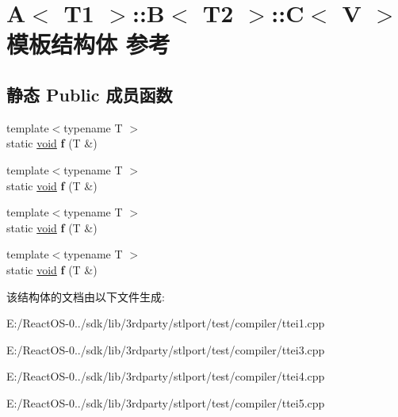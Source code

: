 \hypertarget{struct_a_1_1_b_1_1_c}{}\section{A$<$ T1 $>$\+:\+:B$<$ T2 $>$\+:\+:C$<$ V $>$ 模板结构体 参考}
\label{struct_a_1_1_b_1_1_c}
\subsection*{静态 Public 成员函数}
\begin{DoxyCompactItemize}
\item 
\mbox{\label{struct_a_1_1_b_1_1_c_a9e475b64f8657ce53630bd995e39de63}} 
{\footnotesize template$<$typename T $>$ }\\static \hyperlink{interfacevoid}{void} {\bfseries f} (T \&)
\item 
\mbox{\label{struct_a_1_1_b_1_1_c_a9e475b64f8657ce53630bd995e39de63}} 
{\footnotesize template$<$typename T $>$ }\\static \hyperlink{interfacevoid}{void} {\bfseries f} (T \&)
\item 
\mbox{\label{struct_a_1_1_b_1_1_c_a9e475b64f8657ce53630bd995e39de63}} 
{\footnotesize template$<$typename T $>$ }\\static \hyperlink{interfacevoid}{void} {\bfseries f} (T \&)
\item 
\mbox{\label{struct_a_1_1_b_1_1_c_a9e475b64f8657ce53630bd995e39de63}} 
{\footnotesize template$<$typename T $>$ }\\static \hyperlink{interfacevoid}{void} {\bfseries f} (T \&)
\end{DoxyCompactItemize}


该结构体的文档由以下文件生成\+:\begin{DoxyCompactItemize}
\item 
E\+:/\+React\+O\+S-\/0../sdk/lib/3rdparty/stlport/test/compiler/ttei1.\+cpp\item 
E\+:/\+React\+O\+S-\/0../sdk/lib/3rdparty/stlport/test/compiler/ttei3.\+cpp\item 
E\+:/\+React\+O\+S-\/0../sdk/lib/3rdparty/stlport/test/compiler/ttei4.\+cpp\item 
E\+:/\+React\+O\+S-\/0../sdk/lib/3rdparty/stlport/test/compiler/ttei5.\+cpp\end{DoxyCompactItemize}
